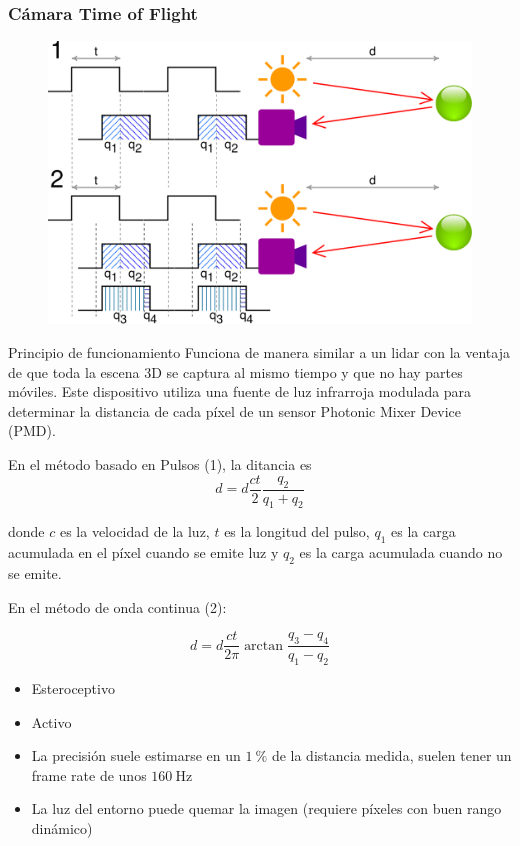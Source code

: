 \begin{frame}
    \frametitle{Cámara Time of Flight}
    \scriptsize

    \begin{figure}[!h]
        \includegraphics[width=0.4\columnwidth]{images/time_of_flight_camera.pdf}
    \end{figure}
    
    \begin{block}{Principio de funcionamiento}
        Funciona de manera similar a un lidar con la ventaja de que toda la escena 3D se captura al mismo tiempo y que no hay partes móviles. Este dispositivo utiliza una fuente de luz infrarroja modulada para determinar la distancia de cada píxel de un sensor Photonic Mixer Device (PMD).
        
        En el método basado en Pulsos (1), la ditancia es
        \begin{equation*}
            d = d\frac{c t}{2} \dfrac{q_{2}}{q_{1} + q_{2}}
        \end{equation*}
        
        donde $c$ es la velocidad de la luz, $t$ es la longitud del pulso, $q_{1}$ es la carga acumulada en el píxel cuando se emite luz y $q_{2}$ es la carga acumulada cuando no se emite.
        
        En el método de onda continua (2):
        
        \begin{equation*}
            d = d\frac{c t}{2\pi} \arctan \dfrac{q_{3} - q_{4}}{q_{1} - q_{2}}
        \end{equation*}        
    \end{block}
    
    \begin{itemize}
        \item Esteroceptivo
        \item Activo
        \item La precisión suele estimarse en un $\SI{1}{\percent}$ de la distancia medida, suelen tener un frame rate de unos $\SI{160}{\hertz}$
        \item La luz del entorno puede quemar la imagen (requiere píxeles con buen rango dinámico)
    \end{itemize}
    
\end{frame}